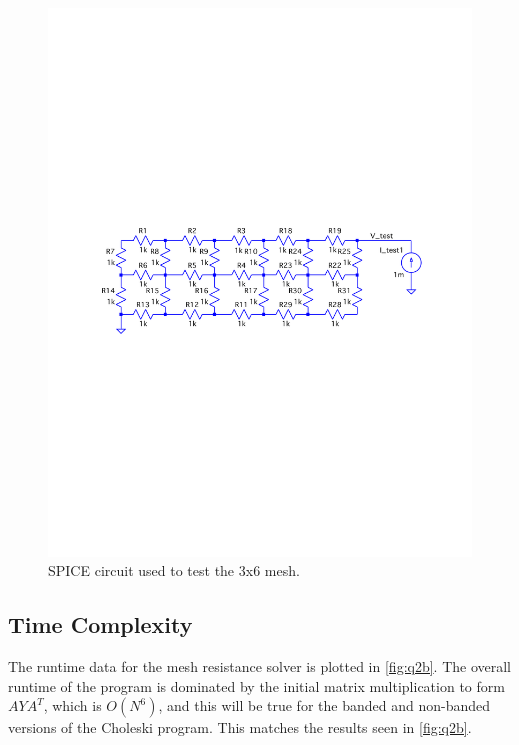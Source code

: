 \documentclass[a4paper,titlepage]{article}
\begin{document}
	\begin{figure}[!htb]
		\centering
		\includegraphics[width=\columnwidth]{plots/q2a_mesh_3.pdf}
		\caption
		{SPICE circuit used to test the 3x6 mesh.}
		\label{fig:q2a_mesh_3}
	\end{figure}
	
	\subsection{Time Complexity}
	
	The runtime data for the mesh resistance solver is plotted in \autoref{fig:q2b}. The overall runtime of the program is dominated by the initial matrix multiplication to form $AYA^T$, which is $O(N^6)$, and this will be true for the banded and non-banded versions of the Choleski program. This matches the results seen in \autoref{fig:q2b}.
	
\end{document}
